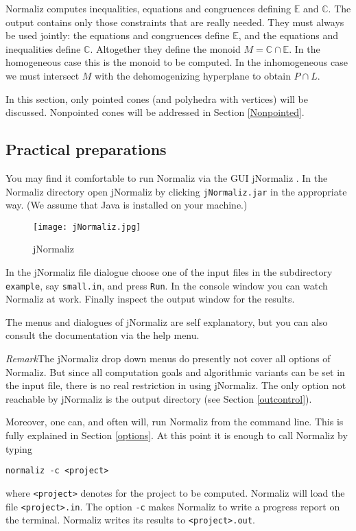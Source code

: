 \documentclass[12pt,a4paper]{scrartcl}
\theoremstyle{definition}
\def\CC{{\mathbb C}}
\def\EE{{\mathbb E}}
\def\ttt{\texttt}
\begin{document}
Normaliz computes inequalities, equations and congruences defining $\EE$ and $\CC$. The output contains only those constraints that are really needed. They must always be used jointly: the equations and congruences define $\EE$, and the equations and inequalities define $\CC$. Altogether they define the monoid $M=\CC\cap\EE$. In the homogeneous case this is the monoid to be computed. In the inhomogeneous case we must intersect $M$ with the dehomogenizing hyperplane to obtain $P\cap L$.

In this section, only pointed cones (and polyhedra with vertices) will be discussed. Nonpointed cones will be addressed in Section \ref{Nonpointed}. 


\subsection{Practical preparations}

You may find it comfortable to run Normaliz via the GUI jNormaliz \cite{AI}. In the Normaliz directory open jNormaliz by clicking
\ttt{jNormaliz.jar} in the appropriate way. (We assume that
Java is installed on your machine.)
\begin{figure}[bht]
	\centering
	\texttt{[image: jNormaliz.jpg]}\\%
	\caption{jNormaliz}\label{new}
\end{figure}
In the jNormaliz file dialogue choose one of the input files
in the subdirectory \ttt{example}, say \ttt{small.in}, and
press \ttt{Run}. In the console window you can watch Normaliz
at work. Finally inspect the output window for the results.

The menus and dialogues of jNormaliz are self explanatory, but you
can also consult the documentation \cite{AI} via the help menu.

\emph{Remark}\enspace The jNormaliz drop down menus do presently not cover all options of Normaliz. But since all computation goals and algorithmic variants can be set in the input file, there is no real restriction in using jNormaliz. The only option not reachable by jNormaliz is the output directory (see Section \ref{outcontrol}).

Moreover, one can, and often will, run Normaliz from the
command line. This is fully explained in Section \ref{options}. At this point it is enough to call Normaliz by typing
\begin{Verbatim}
normaliz -c <project>
\end{Verbatim}
where \ttt{<project>} denotes for the project to be computed. Normaliz will load the file \ttt{<project>.in}. The option \verb|-c| makes Normaliz to write a progress report on the terminal. Normaliz writes its results to \verb|<project>.out|.
\end{document}
